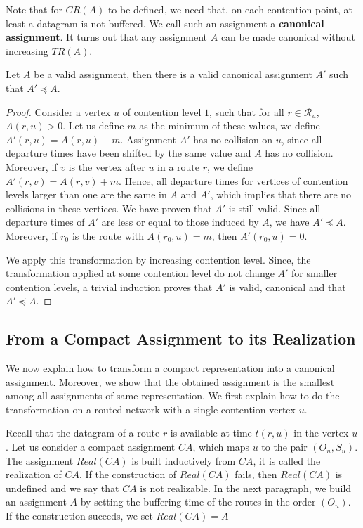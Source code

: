 Note that for $CR(A)$ to be defined, we need that, on each contention point, at least a datagram is not buffered. We call such an assignment a \textbf{canonical assignment}. It turns out that any assignment $A$ can be made canonical without increasing $TR(A)$.

\begin{lemma}\label{lemma:canonical_min}
Let $A$ be a valid assignment, then there is a valid canonical assignment $A'$ such that $A' \preceq A$.
\end{lemma}
\begin{proof}
Consider a vertex $u$ of contention level $1$, such that for all $r \in \mathcal{R}_u$, $A(r,u) > 0$. Let us define $m$ as the minimum of these values, we define $A'(r,u) = A(r,u) - m$. Assignment $A'$ has no collision on $u$, since all departure times have been shifted by the same value and $A$ has no collision. Moreover, if $v$ is the vertex after $u$ in a route $r$, we define  $A'(r,v) = A(r,v) + m$. Hence, all departure times for vertices of contention levels larger than one are the same in $A$ and $A'$, which implies that there are no collisions in these vertices. We have proven that $A'$ is still valid. Since all departure times of $A'$ are less or equal to those induced by $A$, we have $A' \preceq A$. Moreover, if $r_0$ is the route with $A(r_0,u) = m$, then $A'(r_0,u) = 0$. 

We apply this transformation by increasing contention level. Since, the transformation applied at some contention level do not change $A'$ for smaller contention levels, a trivial induction proves that $A'$ is valid, canonical and that $A' \preceq A$.
\end{proof}


\subsection{From a Compact Assignment to its Realization}


We now explain how to transform a compact representation into a canonical assignment.
Moreover, we show that the obtained assignment is the smallest among all assignments of same representation. We first explain how to do the transformation on a routed network with a single contention vertex $u$.

Recall that the datagram of a route $r$ is available at time $t(r,u)$ in the vertex $u$.
Let us consider a compact assignment $CA$, which maps $u$ to the pair $(O_u,S_u)$.
The assignment $Real(CA)$ is built inductively from $CA$, it is called the realization of $CA$. 
If the construction of $Real(CA)$ fails, then $Real(CA)$ is undefined and we say that $CA$ is not realizable. In the next paragraph, we build an assignment $A$ by setting the buffering time of the routes in the order
 $(O_u)$. If the construction suceeds, we set $Real(CA) = A$ 


